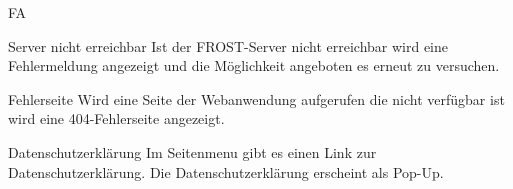 \begin{Kriterien}{FA}
 \item[Server nicht erreichbar]
  Ist der \gls{FROST-Server} nicht erreichbar wird eine Fehlermeldung angezeigt und die Möglichkeit angeboten es erneut zu versuchen.

 \item[Fehlerseite]
  Wird eine Seite der \gls{Webanwendung} aufgerufen die nicht verfügbar ist wird eine 404-Fehlerseite angezeigt.

 \item[Datenschutzerklärung]
  Im \gls{Seitenmenu} gibt es einen Link zur Datenschutzerklärung.
  Die Datenschutzerklärung erscheint als \gls{Pop-Up}.
\end{Kriterien}
